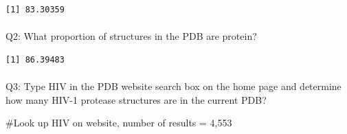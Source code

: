 \documentclass[
  letterpaper,
  DIV=11,
  numbers=noendperiod]{scrartcl}
\makeatletter
\let\oldparagraph\paragraph
\renewcommand{\paragraph}{
    \@ifstar
      \xxxParagraphStar
      \xxxParagraphNoStar
  }
\newcommand{\xxxParagraphStar}[1]{\oldparagraph*{#1}\mbox{}}
\newcommand{\xxxParagraphNoStar}[1]{\oldparagraph{#1}\mbox{}}
\newenvironment{Shaded}{\begin{snugshade}}{\end{snugshade}}
\newcommand{\CommentTok}[1]{\textcolor[rgb]{0.37,0.37,0.37}{#1}}
\newcommand{\DecValTok}[1]{\textcolor[rgb]{0.68,0.00,0.00}{#1}}
\newcommand{\FunctionTok}[1]{\textcolor[rgb]{0.28,0.35,0.67}{#1}}
\newcommand{\NormalTok}[1]{\textcolor[rgb]{0.00,0.23,0.31}{#1}}
\newcommand{\SpecialCharTok}[1]{\textcolor[rgb]{0.37,0.37,0.37}{#1}}
\newcommand{\StringTok}[1]{\textcolor[rgb]{0.13,0.47,0.30}{#1}}
\makeatother
\begin{document}
\begin{Shaded}
\end{Shaded}

\begin{verbatim}
[1] 83.30359
\end{verbatim}

\paragraph{Q2: What proportion of structures in the PDB are
protein?}\label{q2-what-proportion-of-structures-in-the-pdb-are-protein}

\begin{Shaded}
\end{Shaded}

\begin{verbatim}
[1] 86.39483
\end{verbatim}

\paragraph{Q3: Type HIV in the PDB website search box on the home page
and determine how many HIV-1 protease structures are in the current
PDB?}\label{q3-type-hiv-in-the-pdb-website-search-box-on-the-home-page-and-determine-how-many-hiv-1-protease-structures-are-in-the-current-pdb}

\begin{Shaded}
\begin{Highlighting}[]
\CommentTok{\#Look up HIV on website, number of results = 4,553}
\end{Highlighting}
\end{Shaded}
\end{document}
